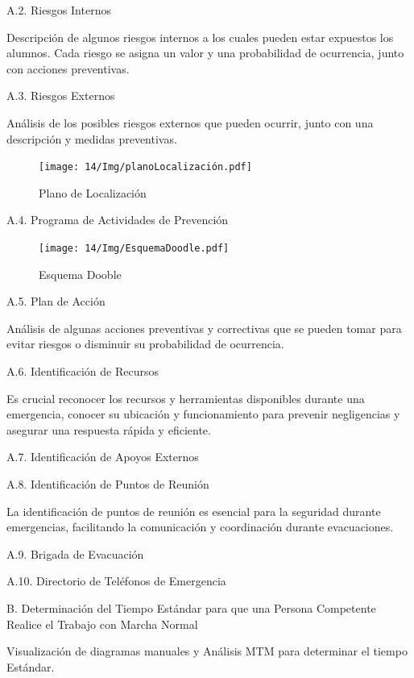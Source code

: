     A.2. Riesgos Internos
    
    Descripción de algunos riesgos internos a los cuales pueden estar expuestos los alumnos. Cada riesgo se asigna un valor y una probabilidad de ocurrencia, junto con acciones preventivas.
    
    A.3. Riesgos Externos
    
    Análisis de los posibles riesgos externos que pueden ocurrir, junto con una descripción y medidas preventivas.
    
    \begin{figure}[H]
        \centering
        \texttt{[image: 14/Img/planoLocalización.pdf]}
        \caption{Plano de Localización}
    \end{figure}
    A.4. Programa de Actividades de Prevención
    
    \begin{figure}[H]
        \centering
        \texttt{[image: 14/Img/EsquemaDoodle.pdf]}
        \caption{Esquema Dooble}
    \end{figure}
    
    A.5. Plan de Acción
    
    Análisis de algunas acciones preventivas y correctivas que se pueden tomar para evitar riesgos o disminuir su probabilidad de ocurrencia.
    
    A.6. Identificación de Recursos
    
    Es crucial reconocer los recursos y herramientas disponibles durante una emergencia, conocer su ubicación y funcionamiento para prevenir negligencias y asegurar una respuesta rápida y eficiente.
    
    A.7. Identificación de Apoyos Externos
    
    A.8. Identificación de Puntos de Reunión
    
    La identificación de puntos de reunión es esencial para la seguridad durante emergencias, facilitando la comunicación y coordinación durante evacuaciones.
    
    A.9. Brigada de Evacuación
    
    A.10. Directorio de Teléfonos de Emergencia
    
    B. Determinación del Tiempo Estándar para que una Persona Competente Realice el Trabajo con Marcha Normal
    
    Visualización de diagramas manuales y Análisis MTM para determinar el tiempo Estándar.
    
